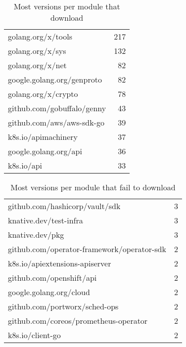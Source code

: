 \begin{table}[ht]
\caption{Most versions per module that  download}
\label{table:versions}
\begin{tabular}{|l|r|}
\hline
 golang.org/x/tools & 217 \\
 golang.org/x/sys & 132 \\
 golang.org/x/net & 82 \\
 google.golang.org/genproto & 82 \\
 golang.org/x/crypto & 78 \\
 github.com/gobuffalo/genny & 43 \\
 github.com/aws/aws-sdk-go & 39 \\
 k8s.io/apimachinery & 37 \\
 google.golang.org/api & 36 \\
 k8s.io/api & 33 \\
\hline
\end{tabular}
\end{table}
\begin{table}[ht]
\caption{Most versions per module that fail to download}
\label{table:failversions}
\begin{tabular}{|l|r|}
\hline
 github.com/hashicorp/vault/sdk & 3 \\
 knative.dev/test-infra & 3 \\
 knative.dev/pkg & 3 \\
 github.com/operator-framework/operator-sdk & 2 \\
 k8s.io/apiextensions-apiserver & 2 \\
 github.com/openshift/api & 2 \\
 google.golang.org/cloud & 2 \\
 github.com/portworx/sched-ops & 2 \\
 github.com/coreos/prometheus-operator & 2 \\
 k8s.io/client-go & 2 \\
\hline
\end{tabular}
\end{table}
